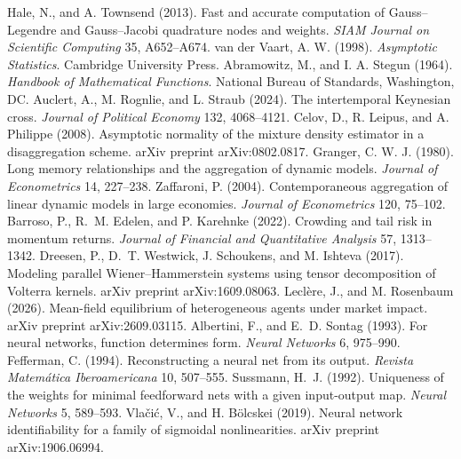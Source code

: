  Hale, N., and A. Townsend (2013). Fast and accurate computation of Gauss--Legendre and Gauss--Jacobi quadrature nodes and weights. \emph{SIAM Journal on Scientific Computing} 35, A652--A674.
 van der Vaart, A. W. (1998). \emph{Asymptotic Statistics}. Cambridge University Press.
 Abramowitz, M., and I. A. Stegun (1964). \emph{Handbook of Mathematical Functions}. National Bureau of Standards, Washington, DC.
 Auclert, A., M. Rognlie, and L. Straub (2024). The intertemporal Keynesian cross. \emph{Journal of Political Economy} 132, 4068--4121.
 Celov, D., R. Leipus, and A. Philippe (2008). Asymptotic normality of the mixture density estimator in a disaggregation scheme. arXiv preprint arXiv:0802.0817.
 Granger, C. W. J. (1980). Long memory relationships and the aggregation of dynamic models. \emph{Journal of Econometrics} 14, 227--238.
 Zaffaroni, P. (2004). Contemporaneous aggregation of linear dynamic models in large economies. \emph{Journal of Econometrics} 120, 75--102.
 Barroso, P., R.~M. Edelen, and P. Karehnke (2022). Crowding and tail risk in momentum returns. \emph{Journal of Financial and Quantitative Analysis} 57, 1313--1342.
 Dreesen, P., D.~T. Westwick, J. Schoukens, and M. Ishteva (2017). Modeling parallel Wiener--Hammerstein systems using tensor decomposition of Volterra kernels. arXiv preprint arXiv:1609.08063.
 Lecl\`ere, J., and M. Rosenbaum (2026). Mean-field equilibrium of heterogeneous agents under market impact. arXiv preprint arXiv:2609.03115.
 Albertini, F., and E.~D. Sontag (1993). For neural networks, function determines form. \emph{Neural Networks} 6, 975--990.
 Fefferman, C. (1994). Reconstructing a neural net from its output. \emph{Revista Matem\'atica Iberoamericana} 10, 507--555.
 Sussmann, H.~J. (1992). Uniqueness of the weights for minimal feedforward nets with a given input-output map. \emph{Neural Networks} 5, 589--593.
 Vla\v{c}i\'c, V., and H. B\"olcskei (2019). Neural network identifiability for a family of sigmoidal nonlinearities. arXiv preprint arXiv:1906.06994.
